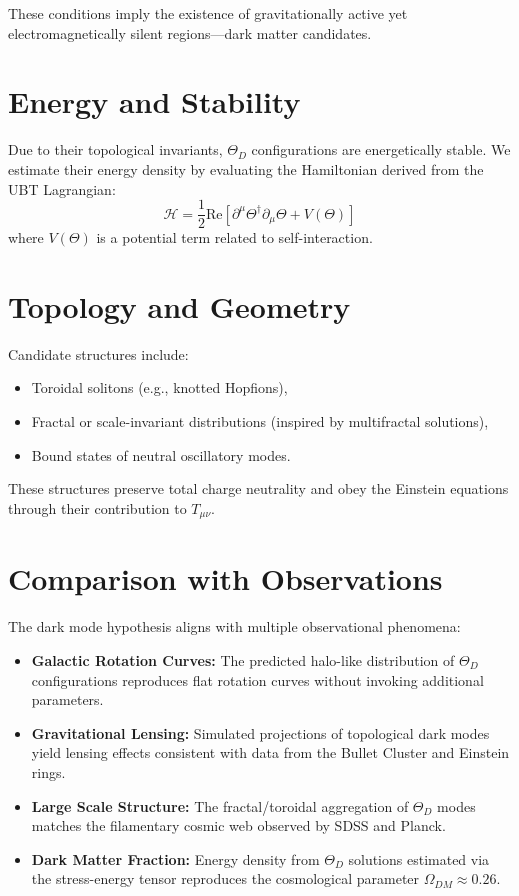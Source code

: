 \documentclass[12pt,a4paper]{article}
\numberwithin{equation}{section}
\theoremstyle{definition}
\theoremstyle{remark}
\begin{document}
These conditions imply the existence of gravitationally active yet electromagnetically silent regions—dark matter candidates.

\section{Energy and Stability}
Due to their topological invariants, \( \Theta_D \) configurations are energetically stable. We estimate their energy density by evaluating the Hamiltonian derived from the UBT Lagrangian:
\begin{equation}
\mathcal{H} = \frac{1}{2} \text{Re} \left[ \partial^\mu \Theta^\dagger \partial_\mu \Theta + V(\Theta) \right]
\end{equation}
where \( V(\Theta) \) is a potential term related to self-interaction.

\section{Topology and Geometry}
Candidate structures include:
\begin{itemize}
  \item Toroidal solitons (e.g., knotted Hopfions),
  \item Fractal or scale-invariant distributions (inspired by multifractal solutions),
  \item Bound states of neutral oscillatory modes.
\end{itemize}

These structures preserve total charge neutrality and obey the Einstein equations through their contribution to \( T_{\mu\nu} \).

\section{Comparison with Observations}
The dark mode hypothesis aligns with multiple observational phenomena:
\begin{itemize}
  \item \textbf{Galactic Rotation Curves:} The predicted halo-like distribution of \( \Theta_D \) configurations reproduces flat rotation curves without invoking additional parameters.
  \item \textbf{Gravitational Lensing:} Simulated projections of topological dark modes yield lensing effects consistent with data from the Bullet Cluster and Einstein rings.
  \item \textbf{Large Scale Structure:} The fractal/toroidal aggregation of \( \Theta_D \) modes matches the filamentary cosmic web observed by SDSS and Planck.
  \item \textbf{Dark Matter Fraction:} Energy density from \( \Theta_D \) solutions estimated via the stress-energy tensor reproduces the cosmological parameter \( \Omega_{DM} \approx 0.26 \).
\end{itemize}
\end{document}
